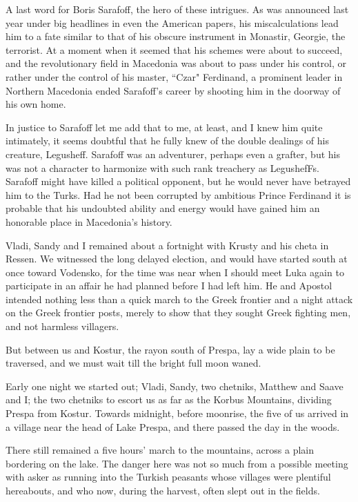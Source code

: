 \documentclass[a5paper,12pt]{book}
\begin{document}
A last word for Boris Sarafoff, the hero of these intrigues. As was announced last year under big headlines in even the American papers, his miscalculations lead him to a fate similar to that of his obscure instrument in Monastir, Georgie, the terrorist. At a moment when it seemed that his schemes were about to succeed, and the revolutionary field in Macedonia was about to pass under his control, or rather under the control of his master, “Czar" Ferdinand, a prominent leader in Northern Macedonia ended Sarafoff’s career by shooting him in the doorway of his own home.

In justice to Sarafoff let me add that to me, at least, and I knew him quite intimately, it seems doubtful that he fully knew of the double dealings of his creature, Legusheff. Sarafoff was an adventurer, perhaps even a grafter, but his was not a character to harmonize with such rank treachery as LegushefFs. Sarafoff might have killed a political opponent, but he would never have betrayed him to the Turks. Had he not been corrupted by ambitious Prince Ferdinand it is probable that his undoubted ability and energy would have gained him an honorable place in Macedonia’s history.

Vladi, Sandy and I remained about a fortnight with Krusty and his cheta in Ressen. We witnessed the long delayed election, and would have started south at once toward Vodensko, for the time was near when I should meet Luka again to participate in an affair he had planned before I had left him. He and Apostol intended nothing less than a quick march to the Greek frontier and a night attack on the Greek frontier posts, merely to show that they sought Greek fighting men, and not harmless villagers.

But between us and Kostur, the rayon south of Prespa, lay a wide plain to be traversed, and we must wait till the bright full moon waned.

Early one night we started out; Vladi, Sandy, two chetniks, Matthew and Saave and I; the two chetniks to escort us as far as the Korbus Mountains, dividing Prespa from Kostur. Towards midnight, before moonrise, the five of us arrived in a village near the head of Lake Prespa, and there passed the day in the woods.

There still remained a five hours' march to the mountains, across a plain bordering on the lake. The danger here was not so much from a possible meeting with asker as running into the Turkish peasants whose villages were plentiful hereabouts, and who now, during the harvest, often slept out in the fields.
\end{document}

